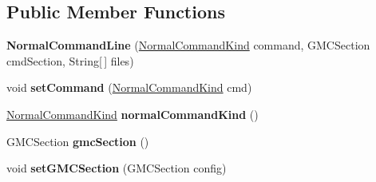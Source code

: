 \subsection*{Public Member Functions}
\begin{DoxyCompactItemize}
\item 
\hypertarget{classedu_1_1udel_1_1cis_1_1vsl_1_1civl_1_1run_1_1common_1_1NormalCommandLine_afe2c5eb13b341ee536b2427804b457a5}{}{\bfseries Normal\+Command\+Line} (\hyperlink{enumedu_1_1udel_1_1cis_1_1vsl_1_1civl_1_1run_1_1common_1_1NormalCommandLine_1_1NormalCommandKind}{Normal\+Command\+Kind} command, G\+M\+C\+Section cmd\+Section, String\mbox{[}$\,$\mbox{]} files)\label{classedu_1_1udel_1_1cis_1_1vsl_1_1civl_1_1run_1_1common_1_1NormalCommandLine_afe2c5eb13b341ee536b2427804b457a5}

\item 
\hypertarget{classedu_1_1udel_1_1cis_1_1vsl_1_1civl_1_1run_1_1common_1_1NormalCommandLine_ac63fe7fec28d92611a3e03a3d521d5f0}{}void {\bfseries set\+Command} (\hyperlink{enumedu_1_1udel_1_1cis_1_1vsl_1_1civl_1_1run_1_1common_1_1NormalCommandLine_1_1NormalCommandKind}{Normal\+Command\+Kind} cmd)\label{classedu_1_1udel_1_1cis_1_1vsl_1_1civl_1_1run_1_1common_1_1NormalCommandLine_ac63fe7fec28d92611a3e03a3d521d5f0}

\item 
\hypertarget{classedu_1_1udel_1_1cis_1_1vsl_1_1civl_1_1run_1_1common_1_1NormalCommandLine_a1d47d77970a01217956a7cbabb1e9fe4}{}\hyperlink{enumedu_1_1udel_1_1cis_1_1vsl_1_1civl_1_1run_1_1common_1_1NormalCommandLine_1_1NormalCommandKind}{Normal\+Command\+Kind} {\bfseries normal\+Command\+Kind} ()\label{classedu_1_1udel_1_1cis_1_1vsl_1_1civl_1_1run_1_1common_1_1NormalCommandLine_a1d47d77970a01217956a7cbabb1e9fe4}

\item 
\hypertarget{classedu_1_1udel_1_1cis_1_1vsl_1_1civl_1_1run_1_1common_1_1NormalCommandLine_a712329b9fef6a59c78e9679c9a7b4f66}{}G\+M\+C\+Section {\bfseries gmc\+Section} ()\label{classedu_1_1udel_1_1cis_1_1vsl_1_1civl_1_1run_1_1common_1_1NormalCommandLine_a712329b9fef6a59c78e9679c9a7b4f66}

\item 
\hypertarget{classedu_1_1udel_1_1cis_1_1vsl_1_1civl_1_1run_1_1common_1_1NormalCommandLine_a386a3417ef6a22da2312e1bd26401079}{}void {\bfseries set\+G\+M\+C\+Section} (G\+M\+C\+Section config)\label{classedu_1_1udel_1_1cis_1_1vsl_1_1civl_1_1run_1_1common_1_1NormalCommandLine_a386a3417ef6a22da2312e1bd26401079}


\end{DoxyCompactItemize}
